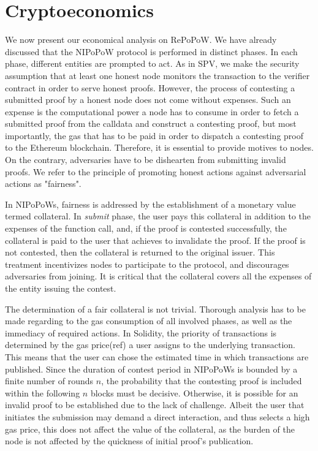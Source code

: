 \section{Cryptoeconomics}

We now present our economical analysis on RePoPoW. We have already discussed
that the NIPoPoW protocol is performed in distinct phases. In each phase,
different entities are prompted to act. As in SPV, we make the security
assumption that at least one honest node monitors the transaction to the
verifier contract in order to serve honest proofs. However, the process of
contesting a submitted proof by a honest node does not come without expenses.
Such an expense is the computational power a node has to consume in order to
fetch a submitted proof from the calldata and construct a contesting proof,
but most importantly, the gas that has to be paid in order to dispatch a
contesting proof to the Ethereum blockchain. Therefore, it is essential to
provide motives to nodes. On the contrary, adversaries have to be dishearten
from submitting invalid proofs.  We refer to the principle of promoting honest
actions against adversarial actions as "fairness".

In NIPoPoWs, fairness is addressed by the establishment of a monetary value
termed collateral. In \emph{submit} phase, the user pays this collateral in
addition to the expenses of the function call, and, if the proof is contested
successfully, the collateral is paid to the user that achieves to invalidate
the proof. If the proof is not contested, then the collateral is returned to
the original issuer. This treatment incentivizes nodes to participate to the
protocol, and discourages adversaries from joining. It is critical that the
collateral covers all the expenses of the entity issuing the contest.

The determination of a fair collateral is not trivial. Thorough analysis has to
be made regarding to the gas consumption of all involved phases, as well as the
immediacy of required actions. In Solidity, the priority of transactions is
determined by the gas price(ref) a user assigns to the underlying
transaction. This means that the user can chose the estimated time in which
transactions are published. Since the duration of contest period in NIPoPoWs is
bounded by a finite number of rounds $n$, the probability that the contesting
proof is included within the following $n$ blocks must be decisive. Otherwise,
it is possible for an invalid proof to be established due to the lack of
challenge. Albeit the user that initiates the submission may demand a direct
interaction, and thus selects a high gas price, this does not affect the value
of the collateral, as the burden of the node is not affected by the quickness
of initial proof's publication.

